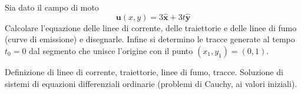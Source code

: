 \begin{exerciseS}
 Sia dato il campo di moto
\begin{equation}
 \bm{u}(x,y) = 3 \bm{\hat{x}} + 3t \bm{\hat{y}} 
\end{equation}
Calcolare l'equazione delle linee di corrente, delle traiettorie e delle linee di fumo (curve di emissione) e disegnarle. Infine si determino le tracce generate al tempo $t_0 = 0$ dal segmento che unisce l'origine con il punto $(x_1,y_1)=(0,1)$.
\end{exerciseS}

\sol

\partone Definizione di linee di corrente, traiettorie, linee di fumo, tracce. Soluzione di sistemi di equazioni differenziali ordinarie (problemi di Cauchy, ai valori iniziali).





